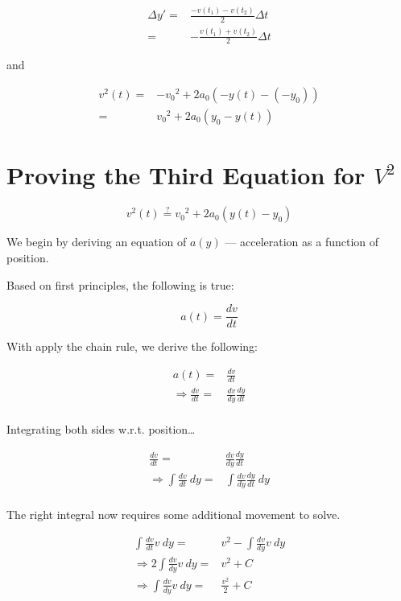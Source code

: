 \documentclass[letterpaper]{article}
\begin{document}
\begin{align}
    \Delta y' =& \frac{-v(t_1)-v(t_2)}{2}\Delta t \\
    =& -\frac{v(t_1)+v(t_2)}{2}\Delta t
\end{align}

and

\begin{align}
    v^2(t) =& {-v_0}^2 + 2a_0 (-y(t) - (-y_0)) \\
    =& {v_0}^2 + 2a_0 (y_0 - y(t)) 
\end{align}


\section{Proving the Third Equation for \(V^2\)}
\label{sec:org59cfc8a}
\begin{equation}
    v^2(t) \stackrel{?}{=} {v_0}^2 + 2a_0(y(t)-y_0)
\end{equation}

We begin by deriving an equation of \(a(y)\) --- acceleration as a function of position.

Based on first principles, the following is true:

\begin{equation}
    a(t) = \frac{dv}{dt}
\end{equation}

With apply the chain rule, we derive the following:

\begin{align}
    a(t) =& \frac{dv}{dt} \\
    \Rightarrow \frac{dv}{dt} =& \frac{dv}{dy}\frac{dy}{dt} \\
\end{align}

Integrating both sides w.r.t. position\ldots{}

\begin{align}
    \frac{dv}{dt} =& \frac{dv}{dy}\frac{dy}{dt} \\
    \Rightarrow \int \frac{dv}{dt}\ dy =& \int \frac{dv}{dy}\frac{dy}{dt}\ dy\\
\end{align}

The right integral now requires some additional movement to solve.

\begin{align}
     \int \frac{dv}{dt}v\ dy =& v^2 - \int \frac{dv}{dy} v\ dy \\
     \Rightarrow 2\int \frac{dv}{dy}v\ dy =& v^2 + C \\
     \Rightarrow \int \frac{dv}{dy}v\ dy =& \frac{v^2}{2} + C
\end{align}
\end{document}
